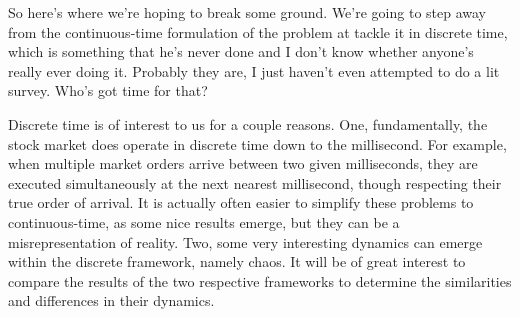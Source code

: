 \documentclass[12pt]{article}
\begin{document}
So here's where we're hoping to break some ground. We're going to step away from the continuous-time formulation of the problem at tackle it in discrete time, which is something that he's never done and I don't know whether anyone's really ever doing it. Probably they are, I just haven't even attempted to do a lit survey. Who's got time for that?

Discrete time is of interest to us for a couple reasons. One, fundamentally, the stock market does operate in discrete time down to the millisecond. For example, when multiple market orders arrive between two given milliseconds, they are executed simultaneously at the next nearest millisecond, though respecting their true order of arrival. It is actually often easier to simplify these problems to continuous-time, as some nice results emerge, but they can be a misrepresentation of reality. Two, some very interesting dynamics can emerge within the discrete framework, namely chaos. It will be of great interest to compare the results of the two respective frameworks to determine the similarities and differences in their dynamics. 
\end{document}

